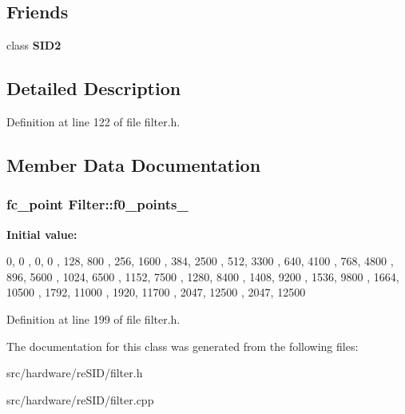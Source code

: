 \subsection*{Friends}
\begin{DoxyCompactItemize}
\item 
\hypertarget{classFilter_a906a1c7f73b30e819416802226bba3ff}{class {\bfseries S\-I\-D2}}\label{classFilter_a906a1c7f73b30e819416802226bba3ff}

\end{DoxyCompactItemize}


\subsection{Detailed Description}


Definition at line 122 of file filter.\-h.



\subsection{Member Data Documentation}
\hypertarget{classFilter_a0d209754d2a633fab6521cdd3c48ed28}{
\subsubsection[{f0\-\_\-points\-\_\-8580}]{\setlength{\rightskip}{0pt plus 5cm}fc\-\_\-point Filter\-::f0\-\_\-points\-\_}}\label{classFilter_a0d209754d2a633fab6521cdd3c48ed28}
{\bfseries Initial value\-:}
\begin{DoxyCode}

{
  
  
  {    0,     0 },   
  {    0,     0 },   
  {  128,   800 },   
  {  256,  1600 },   
  {  384,  2500 },   
  {  512,  3300 },   
  {  640,  4100 },   
  {  768,  4800 },   
  {  896,  5600 },   
  { 1024,  6500 },   
  { 1152,  7500 },   
  { 1280,  8400 },   
  { 1408,  9200 },   
  { 1536,  9800 },   
  { 1664, 10500 },   
  { 1792, 11000 },   
  { 1920, 11700 },   
  { 2047, 12500 },   
  { 2047, 12500 }    
}
\end{DoxyCode}


Definition at line 199 of file filter.\-h.



The documentation for this class was generated from the following files\-:\begin{DoxyCompactItemize}
\item 
src/hardware/re\-S\-I\-D/filter.\-h\item 
src/hardware/re\-S\-I\-D/filter.\-cpp\end{DoxyCompactItemize}
